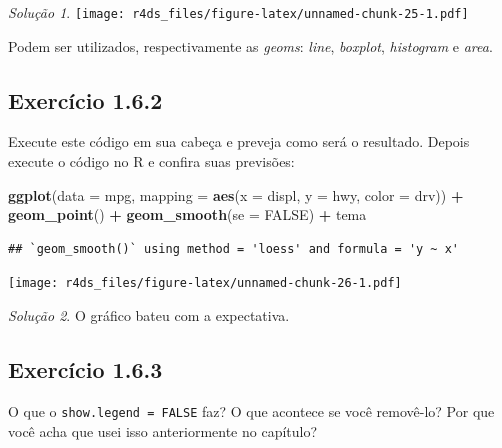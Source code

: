 \documentclass[
]{latex/krantz}
\newenvironment{Shaded}{\begin{snugshade}}{\end{snugshade}}
\newcommand{\AttributeTok}[1]{\textcolor[rgb]{0.13,0.29,0.53}{#1}}
\newcommand{\ConstantTok}[1]{\textcolor[rgb]{0.56,0.35,0.01}{#1}}
\newcommand{\FunctionTok}[1]{\textcolor[rgb]{0.13,0.29,0.53}{\textbf{#1}}}
\newcommand{\NormalTok}[1]{#1}
\newcommand{\SpecialCharTok}[1]{\textcolor[rgb]{0.81,0.36,0.00}{\textbf{#1}}}
\theoremstyle{definition}
\theoremstyle{definition}
\theoremstyle{definition}
\theoremstyle{definition}
\theoremstyle{remark}
\newtheorem*{solution}{Solução}
\begin{document}
\begin{solution}
\texttt{[image: r4ds\_files/figure-latex/unnamed-chunk-25-1.pdf]}

Podem ser utilizados, respectivamente as \emph{geoms}: \emph{line}, \emph{boxplot}, \emph{histogram} e \emph{area}.

\end{solution}

\hypertarget{exr1-6-2}{%
\subsection*{Exercício 1.6.2}\label{exr1-6-2}}

Execute este código em sua cabeça e preveja como será o resultado. Depois execute o código no R e confira suas previsões:

\begin{Shaded}
\begin{Highlighting}[]
\FunctionTok{ggplot}\NormalTok{(}\AttributeTok{data =}\NormalTok{ mpg, }\AttributeTok{mapping =} \FunctionTok{aes}\NormalTok{(}\AttributeTok{x =}\NormalTok{ displ, }\AttributeTok{y =}\NormalTok{ hwy, }\AttributeTok{color =}\NormalTok{ drv)) }\SpecialCharTok{+}
    \FunctionTok{geom\_point}\NormalTok{() }\SpecialCharTok{+}
    \FunctionTok{geom\_smooth}\NormalTok{(}\AttributeTok{se =} \ConstantTok{FALSE}\NormalTok{) }\SpecialCharTok{+}
\NormalTok{    tema}
\end{Highlighting}
\end{Shaded}

\begin{verbatim}
## `geom_smooth()` using method = 'loess' and formula = 'y ~ x'
\end{verbatim}

\texttt{[image: r4ds\_files/figure-latex/unnamed-chunk-26-1.pdf]}

\begin{solution}
O gráfico bateu com a expectativa.
\end{solution}

\hypertarget{exr1-6-3}{%
\subsection*{Exercício 1.6.3}\label{exr1-6-3}}

O que o \texttt{show.legend\ =\ FALSE} faz? O que acontece se você removê-lo? Por que você acha que usei isso anteriormente no capítulo?
\end{document}
